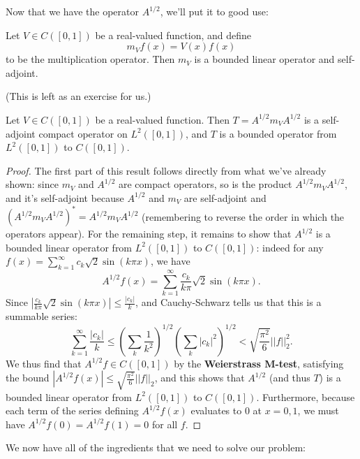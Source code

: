 Now that we have the operator $A^{1/2}$, we'll put it to good use:

\begin{theorem}
Let $V \in C([0, 1])$ be a real-valued function, and define
\[
    m_V f(x) = V(x) f(x)
\]
to be the multiplication operator. Then $m_V$ is a bounded linear operator and self-adjoint. 
\end{theorem}

(This is left as an exercise for us.)

\begin{theorem}\label{aonehalf}
Let $V \in C([0, 1])$ be a real-valued function. Then $T = A^{1/2} m_V A^{1/2}$ is a self-adjoint compact operator on $L^2([0, 1])$, and $T$ is a bounded operator from $L^2([0, 1])$ to $C([0, 1])$. 
\end{theorem}
\begin{proof}
The first part of this result follows directly from what we've already shown: since $m_V$ and $A^{1/2}$ are compact operators, so is the product $A^{1/2} m_V A^{1/2}$, and it's self-adjoint because $A^{1/2}$ and $m_V$ are self-adjoint and $(A^{1/2} m_V A^{1/2})^\ast = A^{1/2} m_V A^{1/2}$ (remembering to reverse the order in which the operators appear). For the remaining step, it remains to show that $A^{1/2}$ is a bounded linear operator from $L^2([0, 1])$ to $C([0, 1])$: indeed for any $f(x) = \sum_{k=1}^{\infty} c_k\sqrt{2} \sin(k \pi x)$, we have
\[
    A^{1/2}f(x) = \sum_{k=1}^{\infty} \frac{c_k}{k\pi} \sqrt{2} \sin(k \pi x).
\]
Since $\left|\frac{c_k}{k\pi}\sqrt{2} \sin(k \pi x) \right| \le \frac{|c_k|}{k}$, and Cauchy-Schwarz tells us that this is a summable series:
\[
    \sum_{k=1}^{\infty} \frac{|c_k|}{k} \le \left(\sum_k \frac{1}{k^2}\right)^{1/2} \left(\sum_{k} |c_k|^2 \right)^{1/2} < \sqrt{\frac{\pi^2}{6}} ||f||_2^2.
\]
We thus find that $A^{1/2} f \in C([0, 1])$ by the \textbf{Weierstrass M-test}, satisfying the bound $|A^{1/2} f(x)| \le \sqrt{\frac{\pi^2}{6}} ||f||_2$, and this shows that $A^{1/2}$ (and thus $T$) is a bounded linear operator from $L^2([0, 1])$ to $C([0, 1])$. Furthermore, because each term of the series defining $A^{1/2}f(x)$ evaluates to $0$ at $x = 0, 1$, we must have $A^{1/2}f(0) = A^{1/2}f(1) = 0$ for all $f$.
\end{proof}

We now have all of the ingredients that we need to solve our problem:

